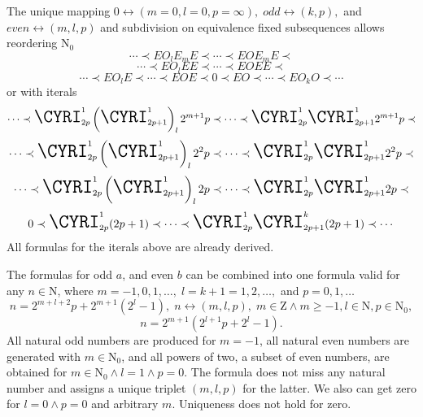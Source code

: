 \documentclass{article}
\begin{document}
The unique mapping $0 \leftrightarrow (m = 0, l = 0, p = \infty), \; odd \leftrightarrow (k, p),$ and $even \leftrightarrow (m, l, p)$ and subdivision on equivalence fixed subsequences allows reordering $\mathrm{N_0}$ 
\begin{displaymath}
\cdots \prec E{O_l}E_m{E} \prec \cdots \prec EOE_m{E} \prec
\end{displaymath}
\begin{displaymath}
\cdots \prec E{O_l}EE \prec \cdots \prec EOEE \prec
\end{displaymath}
\begin{displaymath}
\cdots \prec EO_l{E} \prec \cdots \prec EOE \prec 0 \prec EO \prec \cdots \prec E{O_k}O \prec \cdots
\end{displaymath}
or with iterals
\begin{displaymath}
\cdots \prec
\textrm{\LARGE{\CYRI}}_{2p}^{1}\left(\textrm{\LARGE{\CYRI}}_{2p+1}^{1}\right)_{l}2^{m+1}p
\prec \cdots \prec
\textrm{\LARGE{\CYRI}}_{2p}^{1}\textrm{\LARGE{\CYRI}}_{2p+1}^{1}2^{m+1}p
 \prec
\end{displaymath}
\begin{displaymath}
\cdots \prec
\textrm{\LARGE{\CYRI}}_{2p}^{1}\left(\textrm{\LARGE{\CYRI}}_{2p+1}^{1}\right)_{l}2^2p
\prec \cdots \prec
\textrm{\LARGE{\CYRI}}_{2p}^{1}\textrm{\LARGE{\CYRI}}_{2p+1}^{1}2^2p
 \prec
\end{displaymath}
\begin{displaymath}
\cdots \prec
\textrm{\LARGE{\CYRI}}_{2p}^{1}\left(\textrm{\LARGE{\CYRI}}_{2p+1}^{1}\right)_{l}2p
\prec \cdots \prec
\textrm{\LARGE{\CYRI}}_{2p}^{1}\textrm{\LARGE{\CYRI}}_{2p+1}^{1}2p
 \prec
\end{displaymath}
\begin{displaymath}
0 \prec
\textrm{\LARGE{\CYRI}}_{2p}^{1}(2p+1)
\prec \cdots \prec
\textrm{\LARGE{\CYRI}}_{2p}^{1}
\textrm{\LARGE{\CYRI}}_{2p+1}^{k}(2p+1)
\prec \cdots
\end{displaymath}
All formulas for the iterals above are already derived.

The formulas for odd $a$, and even $b$ can be combined into one formula valid for any $n \in \mathrm{N}$, where $m = -1, 0, 1, \ldots, \; l = k + 1 = 1, 2, \ldots,$ and $p = 0, 1, \ldots$
\begin{displaymath}
n = 2^{m + l + 2}p + 2^{m + 1}(2^l - 1), \; n \leftrightarrow (m, l, p), \; m \in \mathrm{Z} \wedge m \geq -1, l \in \mathrm{N}, p \in \mathrm{N_0},
\end{displaymath}
\begin{displaymath}
n = 2^{m + 1}(2^{l+1}p + 2^l - 1).
\end{displaymath}
All natural odd numbers are produced for $m = -1$, all natural even numbers are generated with $m \in \mathrm{N_0}$, and all powers of two, a subset of even numbers, are obtained for $m \in \mathrm{N_0} \wedge l = 1 \wedge p = 0$. The formula does not miss any natural number and assigns a unique triplet $(m, l, p)$ for the latter. We also can get zero for $l = 0 \wedge p = 0$ and arbitrary $m$. Uniqueness does not hold for zero.
\end{document}
